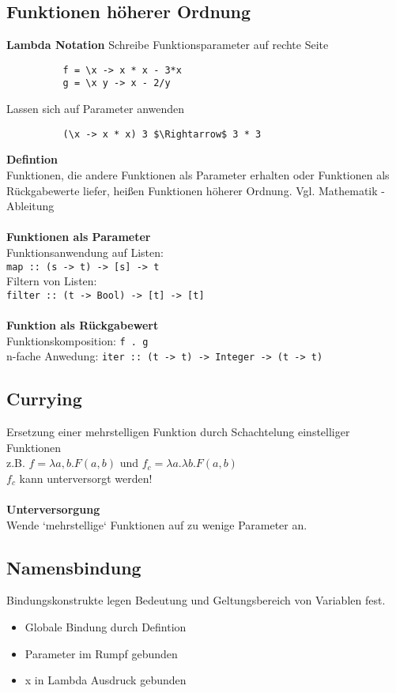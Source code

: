 \documentclass[10pt,a4paper]{article}
\def\code#1{\texttt{#1}}
\begin{document}
        \subsection{Funktionen höherer Ordnung}
        \textbf{Lambda Notation}
        Schreibe Funktionsparameter auf rechte Seite
        \begin{lstlisting}
          f = \x -> x * x - 3*x
          g = \x y -> x - 2/y
        \end{lstlisting}
        Lassen sich auf Parameter anwenden
        \begin{lstlisting}
          (\x -> x * x) 3 $\Rightarrow$ 3 * 3
        \end{lstlisting}
        \textbf{Defintion}\\
        Funktionen, die andere Funktionen als Parameter erhalten oder Funktionen als Rückgabewerte liefer, heißen Funktionen höherer Ordnung.
        Vgl. Mathematik - Ableitung\\\\
        \textbf{Funktionen als Parameter}\\
        Funktionsanwendung auf Listen:\\
        \code{map :: (s -> t) -> [s] -> t}\\
        Filtern von Listen:\\
        \code{filter :: (t -> Bool) -> [t] -> [t]}\\\\
        \textbf{Funktion als Rückgabewert}\\
        Funktionskomposition: \code{f . g}\\
        n-fache Anwedung: \code{iter :: (t -> t) -> Integer -> (t -> t)}

        \subsection{Currying}
        Ersetzung einer mehrstelligen Funktion durch Schachtelung einstelliger Funktionen\\
        z.B. \(f = \lambda a, b.F(a,b)\) und \(f_c = \lambda a.\lambda b. F(a, b)\)\\
        \(f_c\) kann unterversorgt werden!\\\\
        \textbf{Unterversorgung}\\
        Wende `mehrstellige` Funktionen auf zu wenige Parameter an.

        \subsection{Namensbindung}
        Bindungskonstrukte legen Bedeutung und Geltungsbereich von Variablen fest.
        \begin{itemize}
          \item Globale Bindung durch Defintion
          \item Parameter im Rumpf gebunden
          \item x in Lambda Ausdruck gebunden
        \end{itemize}
\end{document}
